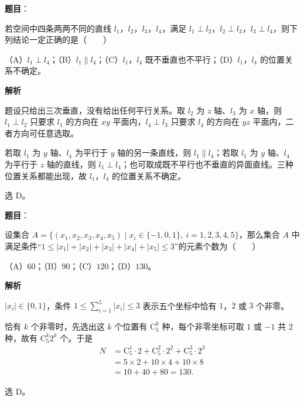 \begin{answer}

\textbf{题目}：

若空间中四条两两不同的直线 $l_1$，$l_2$，$l_3$，$l_4$，满足 $l_1\perp l_2$，$l_2\perp l_3$，$l_3\perp l_4$，则下列结论一定正确的是\mbox{（　　）}

（A）$l_1\perp l_4$；（B）$l_1\parallel l_4$；（C）$l_1$，$l_4$ 既不垂直也不平行；（D）$l_1$，$l_4$ 的位置关系不确定。

\textbf{解析}

题设只给出三次垂直，没有给出任何平行关系。取 $l_2$ 为 $z$ 轴、$l_3$ 为 $x$ 轴，则 $l_1\perp l_2$ 只要求 $l_1$ 的方向在 $xy$ 平面内，$l_4\perp l_3$ 只要求 $l_4$ 的方向在 $yz$ 平面内，二者方向可任意选取。

若取 $l_1$ 为 $y$ 轴、$l_4$ 为平行于 $y$ 轴的另一条直线，则 $l_1\parallel l_4$；若取 $l_1$ 为 $y$ 轴、$l_4$ 为平行于 $z$ 轴的直线，则 $l_1\perp l_4$；也可取成既不平行也不垂直的异面直线。三种位置关系都能出现，故 $l_1$，$l_4$ 的位置关系不确定。

选 D。


\end{answer}
\begin{answer}

\textbf{题目}：

设集合 $A=\{(x_1,x_2,x_3,x_4,x_5)\mid x_i\in\{-1,0,1\},\ i=1,2,3,4,5\}$，那么集合 $A$ 中满足条件“$1\leqslant|x_1|+|x_2|+|x_3|+|x_4|+|x_5|\leqslant 3$”的元素个数为\mbox{（　　）}

（A）$60$；（B）$90$；（C）$120$；（D）$130$。

\textbf{解析}

$|x_i|\in\{0,1\}$，条件 $1\leqslant\sum_{i=1}^5|x_i|\leqslant 3$ 表示五个坐标中恰有 $1$，$2$ 或 $3$ 个非零。

恰有 $k$ 个非零时，先选出这 $k$ 个位置有 $\mathrm C_5^k$ 种，每个非零坐标可取 $1$ 或 $-1$ 共 $2$ 种，故有 $\mathrm C_5^k2^k$ 个。于是
\nopagebreak[4]
\[\begin{aligned}
N&=\mathrm C_5^1\cdot2+\mathrm C_5^2\cdot2^2+\mathrm C_5^3\cdot2^3\\
&=5\times2+10\times4+10\times8\\
&=10+40+80=130.
\end{aligned}\]

选 D。


\end{answer}
